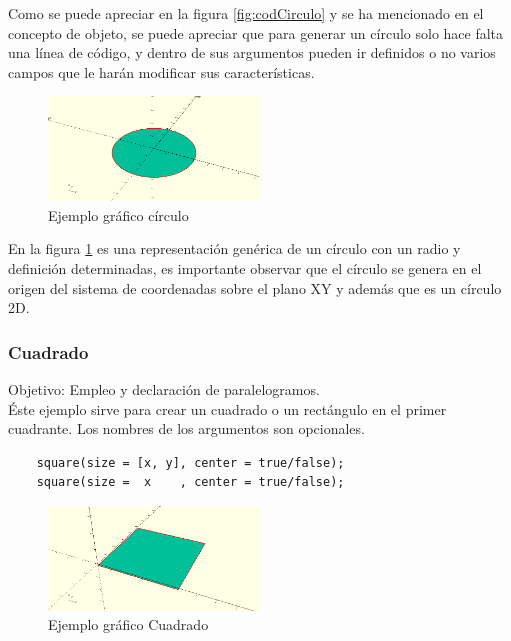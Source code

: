 \documentclass{article}
\begin{document}
Como se puede apreciar en la figura \ref{fig:codCirculo} y se ha mencionado en el concepto de objeto, se puede apreciar que para generar un círculo solo hace falta una línea de código, y dentro de sus argumentos pueden ir definidos o no varios campos que le harán modificar sus características.\\

\begin{figure}[h!]
    \centering
    \includegraphics[width=0.5\textwidth]{Imagenes/Circulo.png}
    \caption{Ejemplo gráfico círculo}
    \label{fig:grafCirculo}
\end{figure}

En la figura \ref{fig:grafCirculo} es una representación genérica de un círculo con un radio y definición determinadas, es importante observar que el círculo se genera en el origen del sistema de coordenadas sobre el plano XY y además que es un círculo 2D.\\

\subsubsection{Cuadrado}

Objetivo: Empleo y declaración de paralelogramos.\\

Éste ejemplo sirve para crear un cuadrado o un rectángulo en el primer cuadrante. Los nombres de los argumentos son opcionales.

\begin{verbatim}
    square(size = [x, y], center = true/false);
    square(size =  x    , center = true/false);
\end{verbatim}

\begin{figure}[h!]
    \centering
    \includegraphics[width=0.5\textwidth]{Imagenes/Cuadrado.png}
    \caption{Ejemplo gráfico Cuadrado}
    \label{fig:grafCuadrado}
\end{figure}
\end{document}
